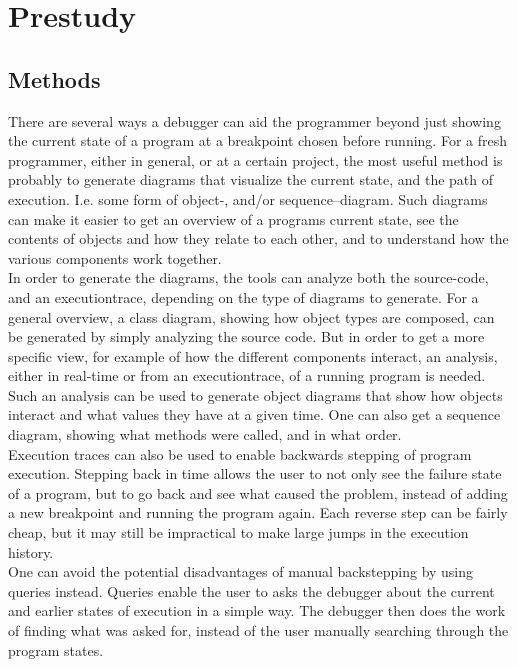 \section{Prestudy}\label{prestudy}
\subsection{Methods}\label{PreMethods}
There are several ways a debugger can aid the programmer beyond just showing the current state of a program at a \gls{breakpoint} chosen before running.
For a fresh programmer, either in general, or at a certain project, the most useful method is probably to generate diagrams that visualize the current state, and the path of execution.
I.e. some form of object-, and/or sequence--diagram.
Such diagrams can make it easier to get an overview of a programs current state, see the contents of objects and how they relate to each other, and to understand how the various components work together.
~\\

In order to generate the diagrams, the tools can analyze both the source-code, and an \gls{executiontrace}, depending on the type of diagrams to generate.
For a general overview, a class diagram, showing how object types are composed, can be generated by simply analyzing the source code.
But in order to get a more specific view, for example of how the different components interact, an analysis, either in real-time or from an \gls{executiontrace}, of a running program is needed.
Such an analysis can be used to generate object diagrams that show how objects interact and what values they have at a given time.
One can also get a sequence diagram, showing what methods were called, and in what order.
~\\

Execution traces can also be used to enable backwards stepping of program execution.
Stepping back in time allows the user to not only see the failure state of a program, but to go back and see what caused the problem, instead of adding a new \gls{breakpoint} and running the program again.
Each reverse step can be fairly cheap, but it may still be impractical to make large jumps in the execution history.
~\\

One can avoid the potential disadvantages of manual backstepping by using queries instead.
Queries enable the user to asks the debugger about the current and earlier states of execution in a simple way.
The debugger then does the work of finding what was asked for, instead of the user manually searching through the program states.
~\\

